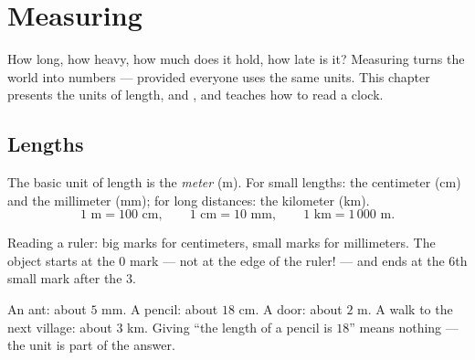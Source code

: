 \chapter{Measuring}\label{ch:g3:measure}

How long, how heavy, how much does it hold, how late is it? Measuring
turns the world into numbers --- provided everyone uses the same
units. This chapter presents the units of length,  and ,
and teaches how to read a clock.

\section{Lengths}

\begin{definition}\label{def:g3:measure:length}
The basic unit of length is the \emph{meter} (m). For small lengths:
the centimeter (cm) and the millimeter (mm); for long distances: the
kilometer (km).
\[
1 \text{ m} = 100 \text{ cm}, \qquad
1 \text{ cm} = 10 \text{ mm}, \qquad
1 \text{ km} = 1\,000 \text{ m}.
\]
\end{definition}

\begin{omfigure}

{\small Reading a ruler: big marks for centimeters, small marks for
millimeters. The object starts at the $0$ mark --- not at the edge of
the ruler! --- and ends at the $6$th small mark after the $3$.}
\end{omfigure}

\begin{example}\label{ex:g3:measure:choose}
An ant: about $5$ mm. A pencil: about $18$ cm. A door: about $2$ m.
A walk to the next village: about $3$ km. Giving ``the length of a
pencil is $18$'' means nothing --- the unit is part of the answer.
\end{example}

